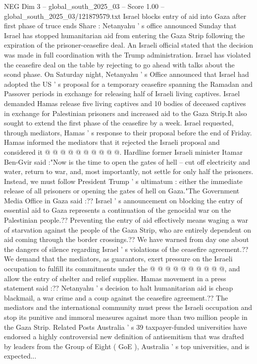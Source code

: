 \begin{textsample}{NEG Dim 3 – global\_south\_2025\_03 – Score 1.00 – global\_south\_2025\_03/121879579.txt}  \label{ex:f3_neg_425}
Israel blocks entry of aid into Gaza after first phase of truce ends Share : Netanyahu ' s office announced Sunday that Israel has stopped humanitarian aid from entering the Gaza Strip following the expiration of the prisoner-ceasefire deal.
An Israeli official stated that the decision was made in full coordination with the Trump administration.
Israel has violated the ceasefire deal on the table by rejecting to go ahead with talks about the scond phase.
On Saturday night, Netanyahu ' s Office announced that Israel had adopted the US ' s proposal for a temporary ceasefire spanning the Ramadan and Passover periods in exchange for releasing half of Israeli living captives.
Israel demanded Hamas release five living captives and 10 bodies of deceased captives in exchange for Palestinian prisoners and increased aid to the Gaza Strip.It also sought to extend the first phase of the ceasefire by a week.
Israel requested, through mediators, Hamas ' s response to their proposal before the end of Friday.
Hamas informed the mediators that it rejected the Israeli proposal and considered it @ @ @ @ @ @ @ @ @ @.
Hardline former Israeli minister Itamar Ben-Gvir said :"Now is the time to open the gates of hell -- cut off electricity and water, return to war, and, most importantly, not settle for only half the prisoners.
Instead, we must follow President Trump ' s ultimatum : either the immediate release of all prisoners or opening the gates of hell on Gaza."The Government Media Office in Gaza said :??
Israel ' s announcement on blocking the entry of essential aid to Gaza represents a continuation of the genocidal war on the Palestinian people.??
Preventing the entry of aid effectively means waging a war of starvation against the people of the Gaza Strip, who are entirely dependent on aid coming through the border crossings.??
We have warned from day one about the dangers of silence regarding Israel ' s violations of the ceasefire agreement.??
We demand that the mediators, as guarantors, exert pressure on the Israeli occupation to fulfill its commitments under the @ @ @ @ @ @ @ @ @ @, and allow the entry of shelter and relief supplies.
Hamas movement in a press statement said :??
Netanyahu ' s decision to halt humanitarian aid is cheap blackmail, a war crime and a coup against the ceasefire agreement.??
The mediators and the international community must press the Israeli occupation and stop its punitive and immoral measures against more than two million people in the Gaza Strip.
Related Posts Australia ' s 39 taxpayer-funded universities have endorsed a highly controversial new definition of antisemitism that was drafted by leaders from the Group of Eight ( GoE ), Australia ' s top universities, and is expected...

\end{textsample}
